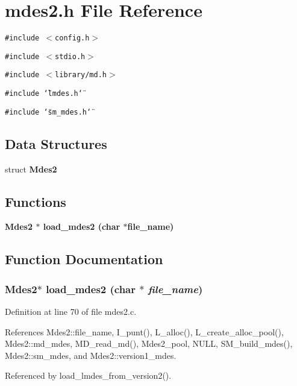 \section{mdes2.h File Reference}
\label{mdes2_8h}
{\tt \#include $<$config.h$>$}\par
{\tt \#include $<$stdio.h$>$}\par
{\tt \#include $<$library/md.h$>$}\par
{\tt \#include \char`\"{}lmdes.h\char`\"{}}\par
{\tt \#include \char`\"{}sm\_\-mdes.h\char`\"{}}\par
\subsection*{Data Structures}
\begin{CompactItemize}
\item 
struct \bf{Mdes2}
\end{CompactItemize}
\subsection*{Functions}
\begin{CompactItemize}
\item 
\bf{Mdes2} $\ast$ \bf{load\_\-mdes2} (char $\ast$file\_\-name)
\end{CompactItemize}


\subsection{Function Documentation}
\subsubsection{\setlength{\rightskip}{0pt plus 5cm}\bf{Mdes2}$\ast$ load\_\-mdes2 (char $\ast$ {\em file\_\-name})}\label{mdes2_8h_a5240a35f7d58785ab2ff7b53a348154}




Definition at line 70 of file mdes2.c.

References Mdes2::file\_\-name, I\_\-punt(), L\_\-alloc(), L\_\-create\_\-alloc\_\-pool(), Mdes2::md\_\-mdes, MD\_\-read\_\-md(), Mdes2\_\-pool, NULL, SM\_\-build\_\-mdes(), Mdes2::sm\_\-mdes, and Mdes2::version1\_\-mdes.

Referenced by load\_\-lmdes\_\-from\_\-version2().